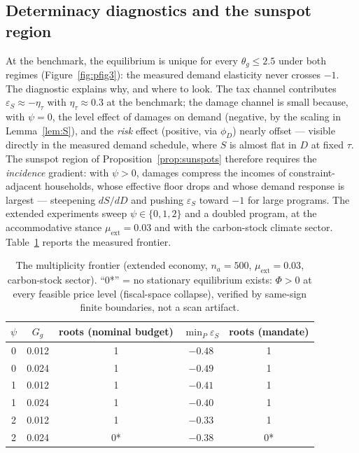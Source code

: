 \documentclass[12pt]{article}
\newcommand{\Sfun}{S}
\begin{document}
\subsection{Determinacy diagnostics and the sunspot region}\label{subsec:sunspots}

At the benchmark, the equilibrium is unique for every $\theta_g\le2.5$ under
both regimes (Figure~\ref{fig:pfig3}): the measured demand elasticity
never crosses $-1$. The diagnostic explains why, and where to look. The tax
channel contributes $\varepsilon_S \approx -\eta_\tau$ with
$\eta_\tau\approx0.3$ at the benchmark; the damage channel is small because,
with $\psi=0$, the level effect of damages on demand (negative, by the
scaling in Lemma~\ref{lem:S}), and the \emph{risk} effect (positive, via
$\phi_D$) nearly offset --- visible directly in the measured demand schedule, where
$\Sfun$ is almost flat in $D$ at fixed $\tau$. The sunspot region of
Proposition~\ref{prop:sunspots} therefore requires the \emph{incidence}
gradient: with $\psi>0$, damages compress the incomes of
constraint-adjacent households, whose effective floor drops and whose demand
response is largest --- steepening $d\Sfun/dD$ and pushing
$\varepsilon_S$ toward $-1$ for large programs. The extended experiments
sweep $\psi\in\{0,1,2\}$ and a doubled program, at the accommodative stance
$\mu_{\mathrm{ext}}=0.03$ and with the carbon-stock climate sector. Table~\ref{tab:frontier} reports the measured
frontier.

\begin{table}[!htb]
\centering
\caption{The multiplicity frontier (extended economy, $n_a=500$,
$\mu_{\mathrm{ext}}=0.03$, carbon-stock sector). ``0*'' = no stationary
equilibrium exists: $\Phi>0$ at every feasible price level (fiscal-space
collapse), verified by same-sign finite boundaries, not a scan artifact.}
\label{tab:frontier}
\begin{tabular}{ccccc}
\toprule
$\psi$ & $G_g$ & roots (nominal budget) & $\min_P \varepsilon_S$ & roots (mandate) \\
\midrule
0 & 0.012 & 1 & $-0.48$ & 1 \\
0 & 0.024 & 1 & $-0.49$ & 1 \\
1 & 0.012 & 1 & $-0.41$ & 1 \\
1 & 0.024 & 1 & $-0.40$ & 1 \\
2 & 0.012 & 1 & $-0.33$ & 1 \\
2 & 0.024 & 0* & $-0.38$ & 0* \\
\bottomrule
\end{tabular}
\end{table}
\end{document}
